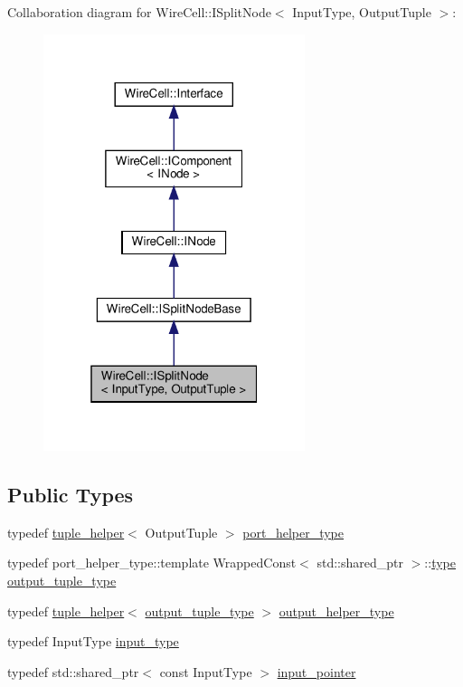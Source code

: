 Collaboration diagram for Wire\+Cell\+:\+:I\+Split\+Node$<$ Input\+Type, Output\+Tuple $>$\+:
\nopagebreak
\begin{figure}[H]
\begin{center}
\leavevmode
\includegraphics[width=217pt]{class_wire_cell_1_1_i_split_node__coll__graph}
\end{center}
\end{figure}
\subsection*{Public Types}
\begin{DoxyCompactItemize}
\item 
typedef \hyperlink{struct_wire_cell_1_1tuple__helper}{tuple\+\_\+helper}$<$ Output\+Tuple $>$ \hyperlink{class_wire_cell_1_1_i_split_node_a1ac35da3c288620eadd7276c9772fa28}{port\+\_\+helper\+\_\+type}
\item 
typedef port\+\_\+helper\+\_\+type\+::template Wrapped\+Const$<$ std\+::shared\+\_\+ptr $>$\+::\hyperlink{namespace_wire_cell_a1f69a2598e2cdb413ffac1157b50670a}{type} \hyperlink{class_wire_cell_1_1_i_split_node_acd382a6b5a9c3f322943ce2dd66fa7f4}{output\+\_\+tuple\+\_\+type}
\item 
typedef \hyperlink{struct_wire_cell_1_1tuple__helper}{tuple\+\_\+helper}$<$ \hyperlink{class_wire_cell_1_1_i_split_node_acd382a6b5a9c3f322943ce2dd66fa7f4}{output\+\_\+tuple\+\_\+type} $>$ \hyperlink{class_wire_cell_1_1_i_split_node_aad34eb757f9df60286669875d91173a1}{output\+\_\+helper\+\_\+type}
\item 
typedef Input\+Type \hyperlink{class_wire_cell_1_1_i_split_node_aa8893ad410e8ed0aaf420a77475ffcc9}{input\+\_\+type}
\item 
typedef std\+::shared\+\_\+ptr$<$ const Input\+Type $>$ \hyperlink{class_wire_cell_1_1_i_split_node_a270990964b36cf939159efa595779407}{input\+\_\+pointer}
\end{DoxyCompactItemize}
